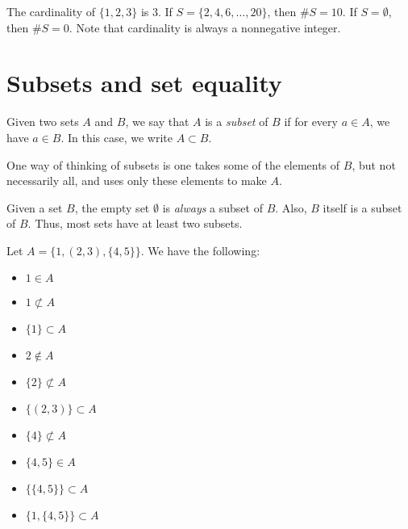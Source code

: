 \documentclass{tufte-book}
\begin{document}
The cardinality of $\{1, 2, 3\}$ is 3. If $S = \{2, 4, 6, \dots, 20\}$, then $\# S = 10$. If $S = \emptyset$, then $\# S = 0$. Note that cardinality is always a nonnegative integer. 



\section{Subsets and set equality}
\label{sec:subsets}

\begin{definition}
  Given two sets $A$ and $B$, we say that $A$ is a \emph{subset}  of $B$ if for every $a \in A$, we have $a \in B$. In this case, we write $A \subset B$. 
\end{definition}
One way of thinking of subsets is one takes some of the elements of $B$, but not necessarily all, and uses only these elements to make $A$.

Given a set $B$, the empty set $\emptyset$ is \emph{always} a subset of $B$. Also, $B$ itself is a subset of $B$. Thus, most sets have at least two subsets.

\begin{example}
  Let $A = \{1, (2,3), \{4, 5\}\}$. We have the following:
  \begin{itemize}
      \item $1 \in A$
      \item $1 \not\subset A$ 
      \item $\{1\} \subset A$
      \item $2 \notin A$
      \item $\{2\} \not\subset A$
      \item $\{(2,3)\}\subset A$
      \item $\{4\} \not\subset A$
      \item $\{4, 5\} \in A$
      \item $\{\{4, 5\}\} \subset A$
      \item $\{1, \{4, 5\}\} \subset A$
  \end{itemize}

\end{example}
\end{document}
